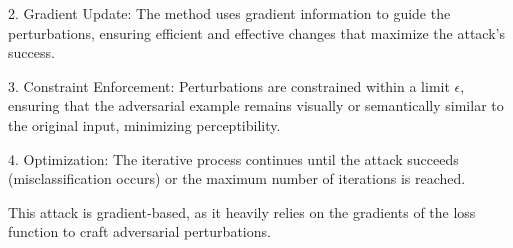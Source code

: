 2. Gradient Update: The method uses gradient information to guide the perturbations, ensuring efficient and effective changes that maximize the attack's success.

3. Constraint Enforcement: Perturbations are constrained within a limit $\epsilon$, ensuring that the adversarial example remains visually or semantically similar to the original input, minimizing perceptibility.

4. Optimization: The iterative process continues until the attack succeeds (misclassification occurs) or the maximum number of iterations is reached.

This attack is gradient-based, as it heavily relies on the gradients of the loss function to craft adversarial perturbations.

